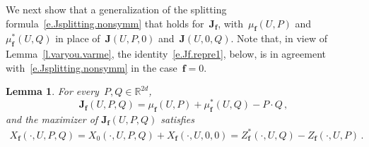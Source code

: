 \documentclass[11pt]{article} %
\numberwithin{equation}{section}
\newtheorem{lemma}[theorem]{Lemma}
\theoremstyle{definition}
\newcommand*{\R}{\ensuremath{\mathbb{R}}}
\newcommand{\f}{\mathbf{f}}
\newcommand{\bfJ}{\mathbf{J}}
\begin{document}
\smallskip

We next show that a generalization of the splitting formula~\eqref{e.Jsplitting.nonsymm} that holds for~$\bfJ_\f$, with~$\mu_\f(U,P)$ and~$\mu^*_\f(U,Q)$ in place of~$\bfJ(U,P,0)$ and~$\bfJ(U,0,Q)$.
Note that, in view of Lemma~\ref{l.varyou.varme}, the identity~\eqref{e.Jf.repre1}, below, is in agreement with~\eqref{e.Jsplitting.nonsymm} in the case~$\f=0$.

\begin{lemma} \label{l.f.varyou.varme}
For every~$P ,Q \in \R^{2d}$, 
\begin{equation}  
\label{e.Jf.repre1}
\bfJ_\f(U, P,Q ) = \mu_\f(U,P) + \mu_\f^*(U,Q) - P \cdot Q \,,
\end{equation}
and the maximizer of $\bfJ_\f(U,P,Q)$ satisfies
\begin{align}  \label{e.Jf.repre2}
X_\f(\cdot,U,P,Q) = X_0(\cdot,U,P,Q) + X_\f(\cdot,U,0,0) = Z_\f^*(\cdot,U,Q) -  Z_\f(\cdot,U,P) 
\,.
\end{align}
\end{lemma}
\end{document}
